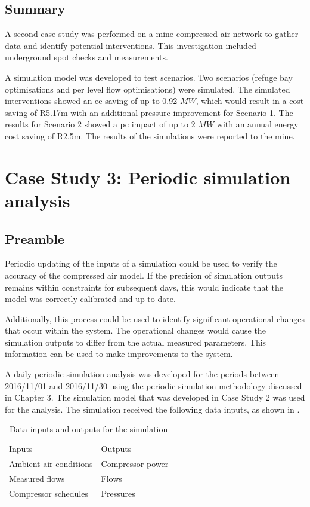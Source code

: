 	\subsection{Summary}
	A second case study was performed on a mine compressed air network to gather data and identify potential interventions. This investigation included underground spot checks and measurements.
	\par 
	 A simulation model was developed to test scenarios. Two scenarios (refuge bay optimisations and per level flow optimisations) were simulated. The simulated interventions showed an \gls{ee} saving of up to 0.92 $MW$, which would result in a cost saving of R5.17m with an additional pressure improvement for Scenario 1. The results for Scenario 2 showed a \gls{pc} impact of up to 2 $MW$ with an annual energy cost saving of R2.5m. The results of the simulations were reported to the mine.
\section{Case Study 3: Periodic simulation analysis}
	\subsection{Preamble}
	Periodic updating of the inputs of a simulation could be used to verify the accuracy of the compressed air model. If the precision of simulation outputs remains within constraints for subsequent days, this would indicate that the model was correctly calibrated and up to date.
	\par 
	 Additionally, this process could be used to identify significant operational changes that occur within the system. The operational changes would cause the simulation outputs to differ from the actual measured parameters. This information can be used to make improvements to the system.
	\par 
	A daily periodic simulation analysis was developed for the periods between 2016/11/01 and 2016/11/30 using the periodic simulation methodology discussed in Chapter 3. The simulation model that was developed in Case Study 2 was used for the analysis. The simulation received the following data inputs, as shown in .
	\\
	\begin{table}[h!]
		\caption{Data inputs and outputs for the simulation}
		\centering
		\begin{tabular}{ll}
			\hline
			Inputs \hspace*{4cm} &Outputs \hspace*{4cm} \\ \hhline{==}
			Ambient air conditions&Compressor power \\
			Measured flows& Flows \\
			Compressor schedules& Pressures \\
			\hline
		\end{tabular}
		
		\label{table: Periodic inputs/outputs}
	\end{table}

